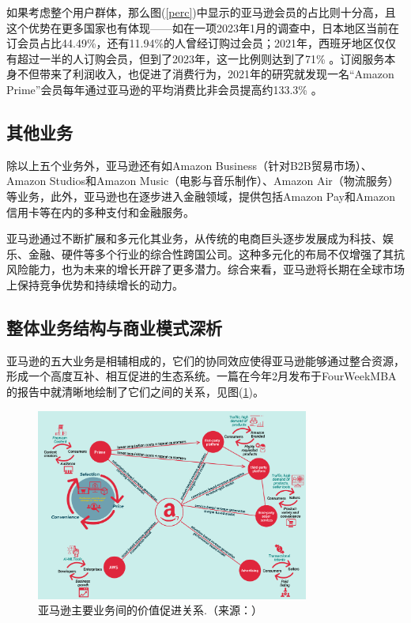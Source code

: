 \documentclass[12pt]{ctexart}
\begin{document}
\begin{itemize}
    如果考虑整个用户群体，那么图(\ref{perc})中显示的亚马逊会员的占比则十分高，且这个优势在更多国家也有体现——如在一项2023年1月的调查中，日本地区当前在订会员占比44.49\%，还有11.94\%的人曾经订购过会员；2021年，西班牙地区仅仅有超过一半的人订购会员，但到了2023年，这一比例则达到了71\% \cite{16}。订阅服务本身不但带来了利润收入，也促进了消费行为，2021年的研究就发现一名“Amazon Prime”会员每年通过亚马逊的平均消费比非会员提高约133.3\% \cite{13}。
    
\end{itemize}

\subsection{其他业务}
除以上五个业务外，亚马逊还有如Amazon Business（针对B2B贸易市场）、Amazon Studios和Amazon Music（电影与音乐制作）、Amazon Air（物流服务）等业务，此外，亚马逊也在逐步进入金融领域，提供包括Amazon Pay和Amazon信用卡等在内的多种支付和金融服务。

亚马逊通过不断扩展和多元化其业务，从传统的电商巨头逐步发展成为科技、娱乐、金融、硬件等多个行业的综合性跨国公司。这种多元化的布局不仅增强了其抗风险能力，也为未来的增长开辟了更多潜力。综合来看，亚马逊将长期在全球市场上保持竞争优势和持续增长的动力。

\subsection{整体业务结构与商业模式深析}
亚马逊的五大业务是相辅相成的，它们的协同效应使得亚马逊能够通过整合资源，形成一个高度互补、相互促进的生态系统。一篇在今年2月发布于FourWeekMBA的报告中就清晰地绘制了它们之间的关系，见图(\ref{rela})。

\begin{figure}[htbp!]
    \centering
    \includegraphics[width=0.8\textwidth]{Images/amazon-value-proposition-1.png}
    \caption{亚马逊主要业务间的价值促进关系.（来源：\cite{23}）}
    \label{rela}
 \end{figure}
\end{document}
